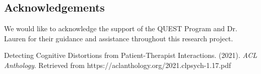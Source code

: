 \documentclass[a0,landscape]{a0poster}
\begin{document}
\begin{multicols}{4}






\color{Teal}
\section*{Acknowledgements}
\color{Black}

We would like to acknowledge the support of the QUEST Program and Dr. Lauren for their guidance and assistance throughout this research project.

\color{Teal}
\begin{thebibliography}{9}
\color{Black}

Detecting Cognitive Distortions from Patient-Therapist Interactions. (2021). \textit{ACL Anthology}. Retrieved from https://aclanthology.org/2021.clpsych-1.17.pdf
\end{thebibliography}

\end{multicols}
\end{document}
